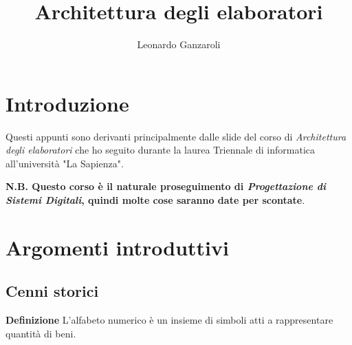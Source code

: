 \documentclass{article}
\title{Architettura degli elaboratori}
\author{Leonardo Ganzaroli}
\date{}
\begin{document}
\maketitle


\tableofcontents

\hypersetup{allcolors=black}

\newpage

\section*{Introduzione}

Questi appunti sono derivanti principalmente dalle slide del corso di \textit{Architettura degli elaboratori} che ho seguito durante la laurea Triennale di informatica all'università "La Sapienza".\newline

\noindent \textbf{N.B. Questo corso è il naturale proseguimento di \textit{Progettazione di Sistemi Digitali}, quindi molte cose saranno date per scontate}.

\newpage

\section{Argomenti introduttivi}

\subsection{Cenni storici}

\textbf{Definizione} L'alfabeto numerico è un insieme di simboli atti a rappresentare quantità di beni.\newline
\end{document}
